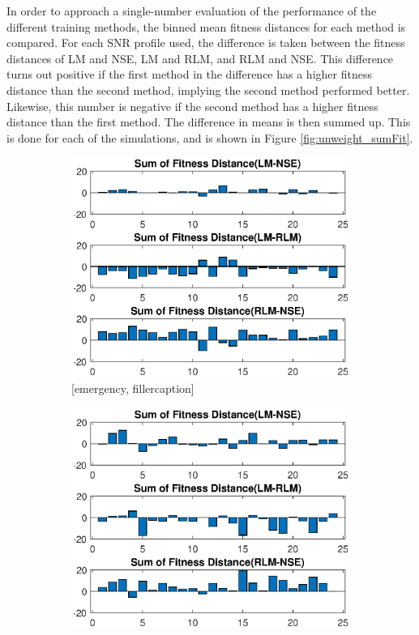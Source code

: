 \par In order to approach a single-number evaluation of the performance of the different training methods, the binned mean fitness distances for each method is compared. For each SNR profile used, the difference is taken between the fitness distances of  LM and NSE, LM and RLM, and RLM and NSE. This difference turns out positive if the first method in the difference has a higher fitness distance than the second method, implying the second method performed better. Likewise, this number is negative if the second method has a higher fitness distance than the first method. The difference in means is then summed up. This is done for each of the simulations, and is shown in Figure \ref{fig:unweight_sumFit}.
\begin{figure}[ht]
\begin{subfigure}{0.55\linewidth}
	\centering
	\includegraphics[scale=0.6]{figures/c_sim_results/emer_unweighted_sumFitness.eps}
	\caption{[emergency, fillercaption]}
	\label{fig:cSimUnweightEmer}
\end{subfigure}%
\begin{subfigure}{0.55\linewidth}
	\centering
	\includegraphics[scale=0.6]{figures/c_sim_results/coop_unweighted_sumFitness.eps}

\end{subfigure}
\end{figure}
